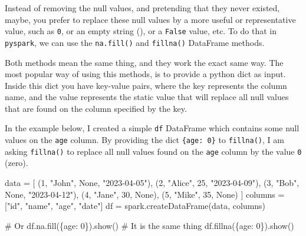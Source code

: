 \documentclass[
  11pt,
  letterpaper,
  DIV=11,
  numbers=noendperiod]{scrreprt}
\newenvironment{Shaded}{\begin{snugshade}}{\end{snugshade}}
\newcommand{\CommentTok}[1]{\textcolor[rgb]{0.37,0.37,0.37}{#1}}
\newcommand{\DecValTok}[1]{\textcolor[rgb]{0.68,0.00,0.00}{#1}}
\newcommand{\NormalTok}[1]{\textcolor[rgb]{0.00,0.23,0.31}{#1}}
\newcommand{\OperatorTok}[1]{\textcolor[rgb]{0.37,0.37,0.37}{#1}}
\newcommand{\StringTok}[1]{\textcolor[rgb]{0.13,0.47,0.30}{#1}}
\newcommand{\VariableTok}[1]{\textcolor[rgb]{0.07,0.07,0.07}{#1}}
\begin{document}
Instead of removing the null values, and pretending that they never
existed, maybe, you prefer to replace these null values by a more useful
or representative value, such as \texttt{0}, or an empty string
(\texttt{\textquotesingle{}\textquotesingle{}}), or a \texttt{False}
value, etc. To do that in \texttt{pyspark}, we can use the
\texttt{na.fill()} and \texttt{fillna()} DataFrame methods.

Both methods mean the same thing, and they work the exact same way. The
most popular way of using this methods, is to provide a python dict as
input. Inside this dict you have key-value pairs, where the key
represents the column name, and the value represents the static value
that will replace all null values that are found on the column specified
by the key.

In the example below, I created a simple \texttt{df} DataFrame which
contains some null values on the \texttt{age} column. By providing the
dict \texttt{\{\textquotesingle{}age\textquotesingle{}:\ 0\}} to
\texttt{fillna()}, I am asking \texttt{fillna()} to replace all null
values found on the \texttt{age} column by the value \texttt{0} (zero).

\begin{Shaded}
\begin{Highlighting}[]
\NormalTok{data }\OperatorTok{=}\NormalTok{ [}
\NormalTok{    (}\DecValTok{1}\NormalTok{, }\StringTok{"John"}\NormalTok{, }\VariableTok{None}\NormalTok{, }\StringTok{"2023{-}04{-}05"}\NormalTok{),}
\NormalTok{    (}\DecValTok{2}\NormalTok{, }\StringTok{"Alice"}\NormalTok{, }\DecValTok{25}\NormalTok{, }\StringTok{"2023{-}04{-}09"}\NormalTok{),}
\NormalTok{    (}\DecValTok{3}\NormalTok{, }\StringTok{"Bob"}\NormalTok{, }\VariableTok{None}\NormalTok{, }\StringTok{"2023{-}04{-}12"}\NormalTok{),}
\NormalTok{    (}\DecValTok{4}\NormalTok{, }\StringTok{"Jane"}\NormalTok{, }\DecValTok{30}\NormalTok{, }\VariableTok{None}\NormalTok{),}
\NormalTok{    (}\DecValTok{5}\NormalTok{, }\StringTok{"Mike"}\NormalTok{, }\DecValTok{35}\NormalTok{, }\VariableTok{None}\NormalTok{)}
\NormalTok{]}
\NormalTok{columns }\OperatorTok{=}\NormalTok{ [}\StringTok{"id"}\NormalTok{, }\StringTok{"name"}\NormalTok{, }\StringTok{"age"}\NormalTok{, }\StringTok{"date"}\NormalTok{]}
\NormalTok{df }\OperatorTok{=}\NormalTok{ spark.createDataFrame(data, columns)}

\CommentTok{\# Or \textasciigrave{}df.na.fill(\{\textquotesingle{}age\textquotesingle{}: 0\}).show()\textasciigrave{}}
\CommentTok{\# It is the same thing}
\NormalTok{df.fillna(\{}\StringTok{\textquotesingle{}age\textquotesingle{}}\NormalTok{: }\DecValTok{0}\NormalTok{\}).show()}
\end{Highlighting}
\end{Shaded}
\end{document}

